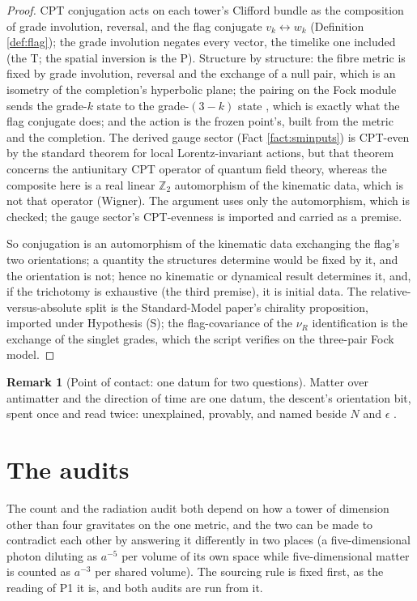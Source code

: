 \documentclass[11pt]{article}
\theoremstyle{definition}
\newtheorem{remark}[theorem]{Remark}
\let\oldsection\section
\renewcommand{\section}{\clearpage\oldsection}   %
\begin{document}
\begin{proof}
CPT conjugation acts on each tower's Clifford bundle as the composition of grade involution, reversal, and the flag conjugate $v_{k} \leftrightarrow w_{k}$ (Definition \ref{def:flag}); the grade involution negates every vector, the timelike one included (the T; the spatial inversion is the P). Structure by structure: the fibre metric is fixed by grade involution, reversal and the exchange of a null pair, which is an isometry of the completion's hyperbolic plane; the pairing on the Fock module sends the grade-$k$ state to the grade-$(3-k)$ state \cite[Prop.~5.6]{ButlerT12}, which is exactly what the flag conjugate does; and the action is the frozen point's, built from the metric and the completion. The derived gauge sector (Fact \ref{fact:sminputs}) is CPT-even by the standard theorem for local Lorentz-invariant actions, but that theorem concerns the antiunitary CPT operator of quantum field theory, whereas the composite here is a real linear $\mathbb{Z}_{2}$ automorphism of the kinematic data, which is not that operator (Wigner). The argument uses only the automorphism, which is checked; the gauge sector's CPT-evenness is imported and carried as a premise.

So conjugation is an automorphism of the kinematic data exchanging the flag's two orientations; a quantity the structures determine would be fixed by it, and the orientation is not; hence no kinematic or dynamical result determines it, and, if the trichotomy is exhaustive (the third premise), it is initial data. The relative-versus-absolute split is the Standard-Model paper's chirality proposition, imported under Hypothesis (S); the flag-covariance of the $\nu_{R}$ identification is the exchange of the singlet grades, which the script verifies on the three-pair Fock model.
\end{proof}

\begin{remark}[Point of contact: one datum for two questions]\label{rem:onebook}
Matter over antimatter and the direction of time are one datum, the descent's orientation bit, spent once and read twice: unexplained, provably, and named beside $N$ and $\epsilon$ \cite{ButlerT17}.
\end{remark}

\section{The audits}\label{sec:audits}

The count and the radiation audit both depend on how a tower of dimension other than four gravitates on the one metric, and the two can be made to contradict each other by answering it differently in two places (a five-dimensional photon diluting as $a^{-5}$ per volume of its own space while five-dimensional matter is counted as $a^{-3}$ per shared volume). The sourcing rule is fixed first, as the reading of P1 it is, and both audits are run from it.
\end{document}

